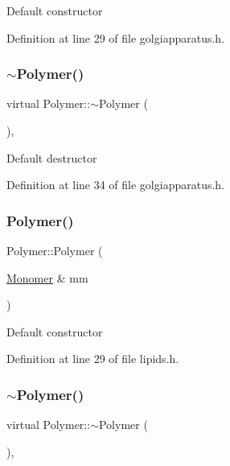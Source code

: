 Default constructor 

Definition at line 29 of file golgiapparatus.\+h.

\mbox{\label{class_polymer_aac2b3983f375a5691c7d5ca1a79594d5}} 
\subsubsection{\texorpdfstring{$\sim$\+Polymer()}{~Polymer()}\hspace{0.1cm}{\footnotesize\ttfamily [5/11]}}
{\footnotesize\ttfamily virtual Polymer\+::$\sim$\+Polymer (\begin{DoxyParamCaption}{ }\end{DoxyParamCaption})\hspace{0.3cm}{\ttfamily [inline]}, {\ttfamily [virtual]}}

Default destructor 

Definition at line 34 of file golgiapparatus.\+h.

\mbox{\label{class_polymer_ae77454a3908652e4df6a26b9cac509a5}} 
\subsubsection{\texorpdfstring{Polymer()}{Polymer()}\hspace{0.1cm}{\footnotesize\ttfamily [6/14]}}
{\footnotesize\ttfamily Polymer\+::\+Polymer (\begin{DoxyParamCaption}\item[{\mbox{\hyperlink{class_monomer}{Monomer}} \&}]{mm }\end{DoxyParamCaption})\hspace{0.3cm}{\ttfamily [inline]}}

Default constructor 

Definition at line 29 of file lipids.\+h.

\mbox{\label{class_polymer_aac2b3983f375a5691c7d5ca1a79594d5}} 
\subsubsection{\texorpdfstring{$\sim$\+Polymer()}{~Polymer()}\hspace{0.1cm}{\footnotesize\ttfamily [6/11]}}
{\footnotesize\ttfamily virtual Polymer\+::$\sim$\+Polymer (\begin{DoxyParamCaption}{ }\end{DoxyParamCaption})\hspace{0.3cm}{\ttfamily [inline]}, {\ttfamily [virtual]}}

